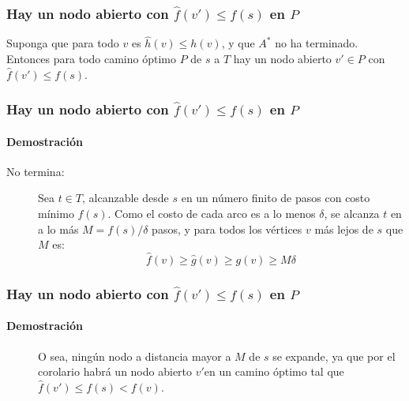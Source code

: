 \documentclass[english, spanish, fleqn,%
hyperref = {colorlinks, urlcolor = blue}%
]{beamer}
\begin{document}
\begin{frame}
  \frametitle{Hay un nodo abierto
                   con \(\widehat{f}(v') \le f(s)\) en \(P\)}

  \begin{corollary}
    Suponga que para todo \(v\) es \(\widehat{h}(v) \le h(v)\),
    y que \(A^*\) no ha terminado.
    Entonces para todo camino óptimo \(P\) de \(s\) a \(T\)
    hay un nodo abierto \(v' \in P\) con \(\widehat{f}(v') \le f(s)\).
  \end{corollary}
\end{frame}

\begin{frame}
  \setcounter{beamerpauses}{2}
  \frametitle{Hay un nodo abierto
                   con \(\widehat{f}(v') \le f(s)\) en \(P\)}
  \framesubtitle{Demostración}

  \begin{description}
  \item[No termina:]
    Sea \(t \in T\),
    alcanzable desde \(s\) en un número finito de pasos
    con costo mínimo \(f(s)\).
    Como el costo de cada arco es a lo menos \(\delta\),
    se alcanza \(t\) en a lo más \(M = f(s) / \delta\) pasos,
    y para todos los vértices \(v\)
    más lejos de \(s\) que \(M\) es:
    \begin{equation*}
      \widehat{f}(v)
        \ge \widehat{g}(v)
        \ge g(v)
        \ge M \delta
    \end{equation*}
  \end{description}
\end{frame}

\begin{frame}
  \setcounter{beamerpauses}{2}
  \frametitle{Hay un nodo abierto
                   con \(\widehat{f}(v') \le f(s)\) en \(P\)}
  \framesubtitle{Demostración}

  \begin{description}
  \item[]
    O sea,
    ningún nodo a distancia mayor a \(M\) de \(s\) se expande,
    ya que por el corolario
    habrá un nodo abierto \(v'\)en un camino óptimo
    tal que \(\widehat{f}(v') \le f(s) < f(v)\).
  \end{description}
\end{frame}
\end{document}

